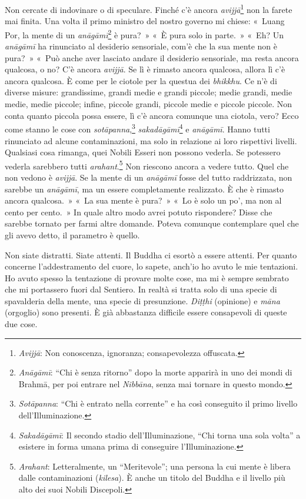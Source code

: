 Non cercate di indovinare o di speculare. Finché c'è ancora
\emph{avijjā}\footnote{\emph{Avijjā}: Non conoscenza, ignoranza;
  consapevolezza offuscata.} non la farete mai finita. Una volta il
primo ministro del nostro governo mi chiese: «~Luang Por, la mente di un
\emph{anāgāmī}\footnote{\emph{Anāgāmī}: ``Chi è senza ritorno'' dopo la
  morte apparirà in uno dei mondi di Brahmā, per poi entrare nel
  \emph{Nibbāna}, senza mai tornare in questo mondo.} è pura?~» «~È pura
solo in parte.~» «~Eh? Un \emph{anāgāmī} ha rinunciato al desiderio
sensoriale, com'è che la sua mente non è pura?~» «~Può anche aver
lasciato andare il desiderio sensoriale, ma resta ancora qualcosa, o no?
C'è ancora \emph{avijjā}. Se lì è rimasto ancora qualcosa, allora lì c'è
ancora qualcosa. È come per le ciotole per la questua dei
\emph{bhikkhu}. Ce n'è di diverse misure: grandissime, grandi medie e
grandi piccole; medie grandi, medie medie, medie piccole; infine,
piccole grandi, piccole medie e piccole piccole. Non conta quanto
piccola possa essere, lì c'è ancora comunque una ciotola, vero? Ecco
come stanno le cose con \emph{sotāpanna},\footnote{\emph{Sotāpanna}:
  ``Chi è entrato nella corrente'' e ha così conseguito il primo livello
  dell'Illuminazione.} \emph{sakadāgāmī}\footnote{\emph{Sakadāgāmī}: Il
  secondo stadio dell'Illuminazione, ``Chi torna una sola volta'' a
  esistere in forma umana prima di conseguire l'Illuminazione.} e
\emph{anāgāmī}. Hanno tutti rinunciato ad alcune contaminazioni, ma solo
in relazione ai loro rispettivi livelli. Qualsiasi cosa rimanga, quei
Nobili Esseri non possono vederla. Se potessero vederla sarebbero tutti
\emph{arahant}.\footnote{\emph{Arahant}: Letteralmente, un
  ``Meritevole''; una persona la cui mente è libera dalle contaminazioni
  (\emph{kilesa}). È anche un titolo del Buddha e il livello più alto
  dei suoi Nobili Discepoli.} Non riescono ancora a vedere tutto. Quel
che non vedono è \emph{avijjā}. Se la mente di un \emph{anāgāmī} fosse
del tutto raddrizzata, non sarebbe un \emph{anāgāmī}, ma un essere
completamente realizzato. È che è rimasto ancora qualcosa.~» «~La sua
mente è pura?~» «~Lo è solo un po', ma non al cento per cento.~» In
quale altro modo avrei potuto rispondere? Disse che sarebbe tornato per
farmi altre domande. Poteva comunque contemplare quel che gli avevo
detto, il parametro è quello.

Non siate distratti. Siate attenti. Il Buddha ci esortò a essere
attenti. Per quanto concerne l'addestramento del cuore, lo sapete,
anch'io ho avuto le mie tentazioni. Ho avuto spesso la tentazione di
provare molte cose, ma mi è sempre sembrato che mi portassero fuori dal
Sentiero. In realtà si tratta solo di una specie di spavalderia della
mente, una specie di presunzione. \emph{Diṭṭhi} (opinione) e \emph{māna}
(orgoglio) sono presenti. È già abbastanza difficile essere consapevoli
di queste due cose.

